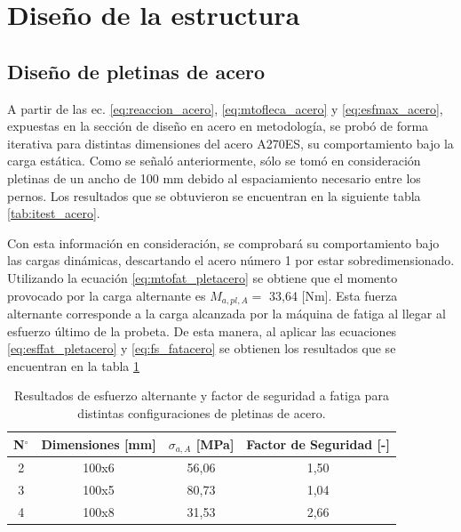 \section{Diseño de la estructura}
\subsection{Diseño de pletinas de acero}
A partir de las ec. \ref{eq:reaccion_acero}, \ref{eq:mtofleca_acero} y \ref{eq:esfmax_acero}, expuestas en la sección de diseño en acero en metodología, se probó de forma iterativa para distintas dimensiones del acero A270ES, su comportamiento bajo la carga estática. Como se señaló anteriormente, sólo se tomó en consideración pletinas de un ancho de 100 mm debido al espaciamiento necesario entre los pernos. Los resultados que se obtuvieron se encuentran en la siguiente tabla \ref{tab:itest_acero}.

\begin{table}[h]
\centering
{}
\caption{Resultados y factor de seguridad para distintas configuraciones de pletinas de acero.}
\label{tab:itest_acero}
\end{table}

Con esta información en consideración, se comprobará su comportamiento bajo las cargas dinámicas, descartando el acero número 1 por estar sobredimensionado. Utilizando la ecuación \ref{eq:mtofat_pletacero} se obtiene que el momento provocado por la carga alternante es $M_{a,pl,A} =$ 33,64 [Nm]. Esta fuerza alternante corresponde a la carga alcanzada por la máquina de fatiga al llegar al esfuerzo último de la probeta. De esta manera, al aplicar las ecuaciones \ref{eq:esffat_pletacero} y \ref{eq:fs_fatacero} se obtienen los resultados que se encuentran en la tabla \ref{tab:itfat_acero}

\begin{table}[h]
\centering
\begin{tabular}{@{}cccc@{}}
\toprule
N$^{\circ}$ & Dimensiones [mm] & $\sigma_{a,A}$ [MPa] & Factor de Seguridad [-] \\ \midrule
2 & 100x6 & 56,06 & 1,50 \\
3 & 100x5 & 80,73 & 1,04 \\
4 & 100x8 & 31,53 & 2,66 \\ \bottomrule
\end{tabular}
\caption{Resultados de esfuerzo alternante y factor de seguridad a fatiga para distintas configuraciones de pletinas de acero.}
\label{tab:itfat_acero}
\end{table}

